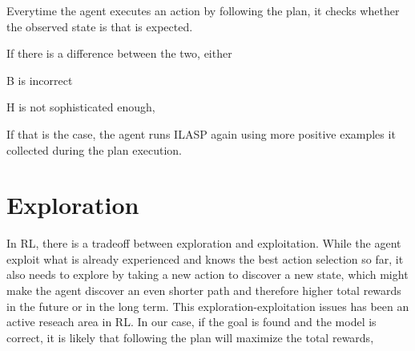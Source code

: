 


Everytime the agent executes an action by following the plan, it checks whether the observed state is that is expected.

If there is a difference between the two, either

B is incorrect

H is not sophisticated enough,

If that is the case, the agent runs ILASP again using more positive examples it collected during the plan execution.

\section{Exploration}
\label{exploration}

In RL, there is a tradeoff between exploration and exploitation. While the agent exploit what is already experienced and knows the best action selection so far, 
it also needs to explore by taking a new action to discover a new state, which might make the agent discover an even shorter path and therefore higher total rewards in the future or in the long term. 
This exploration-exploitation issues has been an active reseach area in RL. 
In our case, if the goal is found and the model is correct, it is likely that following the plan will maximize the total rewards, 


